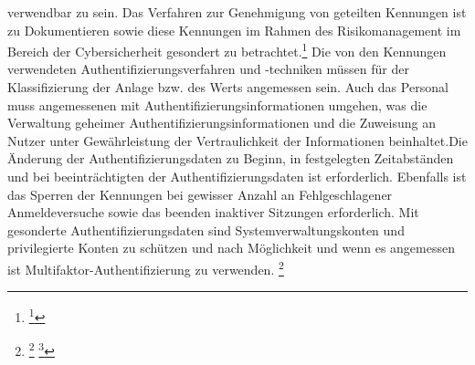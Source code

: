 \documentclass[11pt,a4paper,hidelinks]{article}   %
\begin{document}
verwendbar zu sein. Das Verfahren zur Genehmigung von geteilten Kennungen ist zu Dokumentieren sowie diese Kennungen im Rahmen des Risikomanagement im Bereich der Cybersicherheit gesondert zu betrachtet.\footnote{\footcite[Vgl.][, Anhang, Nummer 11.5.3.]{EU2024-2690}} Die von den Kennungen verwendeten Authentifizierungsverfahren und -techniken müssen für der Klassifizierung der Anlage bzw. des Werts angemessen sein. Auch das Personal muss angemessenen mit Authentifizierungsinformationen umgehen, was die Verwaltung geheimer Authentifizierungsinformationen und die Zuweisung an Nutzer unter Gewährleistung der Vertraulichkeit der Informationen beinhaltet.Die Änderung der Authentifizierungsdaten zu Beginn, in festgelegten Zeitabständen und bei beeinträchtigten der Authentifizierungsdaten ist erforderlich. Ebenfalls ist das Sperren der Kennungen bei gewisser Anzahl an Fehlgeschlagener Anmeldeversuche sowie das beenden inaktiver Sitzungen erforderlich. Mit gesonderte Authentifizierungsdaten sind Systemverwaltungskonten und privilegierte Konten zu schützen und nach Möglichkeit und wenn es angemessen ist Multifaktor-Authentifizierung zu verwenden. \footnote{
                \footnote{\footcite[Vgl.][, Anhang, Nummer 11.6.2., 11.6.3. \& 11.7.1.]{EU2024-2690}}
                \footcite[Vgl.][, §30 Absatz 2, Nummer 9 und 10]{NIS2UmsuCG} %
            }

\end{document}
